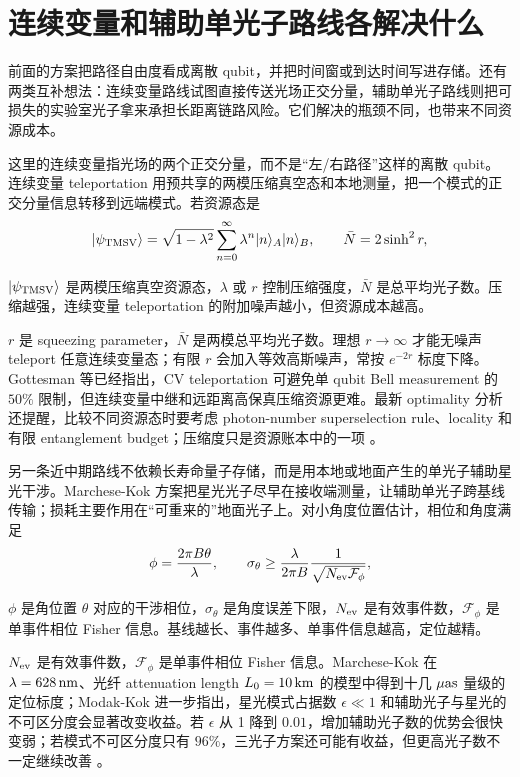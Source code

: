 \section{连续变量和辅助单光子路线各解决什么}

前面的方案把路径自由度看成离散 qubit，并把时间窗或到达时间写进存储。还有两类互补想法：连续变量路线试图直接传送光场正交分量，辅助单光子路线则把可损失的实验室光子拿来承担长距离链路风险。它们解决的瓶颈不同，也带来不同资源成本。

这里的连续变量指光场的两个正交分量，而不是“左/右路径”这样的离散 qubit。连续变量 teleportation 用预共享的两模压缩真空态和本地测量，把一个模式的正交分量信息转移到远端模式。若资源态是
\begin{equation}
  |\psi_{\rm TMSV}\rangle
  =
  \sqrt{1-\lambda^2}
  \sum_{n=0}^{\infty}
  \lambda^n |n\rangle_A|n\rangle_B,
  \qquad
  \bar N = 2\sinh^2 r,
  \label{eq:ch17-tmsv}
\end{equation}
\begin{formulaexplain}[公式 (17.11) 解读]
\(|\psi_{\rm TMSV}\rangle\) 是两模压缩真空资源态，\(\lambda\) 或 \(r\) 控制压缩强度，\(\bar N\) 是总平均光子数。压缩越强，连续变量 teleportation 的附加噪声越小，但资源成本越高。
\end{formulaexplain}
\(r\) 是 squeezing parameter，\(\bar N\) 是两模总平均光子数。理想 \(r\to\infty\) 才能无噪声 teleport 任意连续变量态；有限 \(r\) 会加入等效高斯噪声，常按 \(e^{-2r}\) 标度下降。Gottesman 等已经指出，CV teleportation 可避免单 qubit Bell measurement 的 \(50\%\) 限制，但连续变量中继和远距离高保真压缩资源更难。最新 optimality 分析还提醒，比较不同资源态时要考虑 photon-number superselection rule、locality 和有限 entanglement budget；压缩度只是资源账本中的一项 \citep{1998PhRvL..80..869B,2012PhRvL.109g0503G,2025PhRvR...7d3278Z}。

另一条近中期路线不依赖长寿命量子存储，而是用本地或地面产生的单光子辅助星光干涉。Marchese-Kok 方案把星光光子尽早在接收端测量，让辅助单光子跨基线传输；损耗主要作用在“可重来的”地面光子上。对小角度位置估计，相位和角度满足
\begin{equation}
  \phi
  =
  \frac{2\pi B\theta}{\lambda},
  \qquad
  \sigma_\theta
  \ge
  \frac{\lambda}{2\pi B}
  \frac{1}{\sqrt{N_{\rm ev}\mathcal F_\phi}},
  \label{eq:ch17-angle-fisher}
\end{equation}
\begin{formulaexplain}[公式 (17.12) 解读]
\(\phi\) 是角位置 \(\theta\) 对应的干涉相位，\(\sigma_\theta\) 是角度误差下限，\(N_{\rm ev}\) 是有效事件数，\(\mathcal F_\phi\) 是单事件相位 Fisher 信息。基线越长、事件越多、单事件信息越高，定位越精。
\end{formulaexplain}
\(N_{\rm ev}\) 是有效事件数，\(\mathcal F_\phi\) 是单事件相位 Fisher 信息。Marchese-Kok 在 \(\lambda=628\,{\rm nm}\)、光纤 attenuation length \(L_0=10\,{\rm km}\) 的模型中得到十几 \(\mu{\rm as}\) 量级的定位标度；Modak-Kok 进一步指出，星光模式占据数 \(\epsilon\ll1\) 和辅助光子与星光的不可区分度会显著改变收益。若 \(\epsilon\) 从 1 降到 \(0.01\)，增加辅助光子数的优势会很快变弱；若模式不可区分度只有 \(96\%\)，三光子方案还可能有收益，但更高光子数不一定继续改善 \citep{2023PhRvL.130p0801M,2025PhRvA.111d3701M}。

